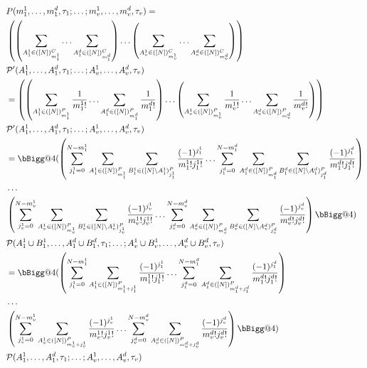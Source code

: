 \documentclass[12pt]{article}
\makeatletter
\newcommand{\vast}{\bBigg@{4}}
\makeatother
\begin{document}
\begin{align}
&P(m_1^1,\ldots,m_1^d,\tau_1; \ldots ; m_v^1, \ldots, m_v^d, \tau_v) =\\
&\left(\left(\sum_{A_1^1 \in ([N])_{m_1^1}^C} \ldots \sum_{A_1^d \in ([N])_{m_1^d}^C}\right) \ldots \left(\sum_{A_v^1 \in ([N])_{m_v^1}^C} \ldots \sum_{A_v^d \in ([N])_{m_v^d}^C}\right)\right)\\
&\mathcal{P'}(A_1^1, \ldots, A_1^d, \tau_1 ; \ldots ; A_v^1, \ldots,A_v^d,\tau_v)\\
&=\left(\left(\sum_{A_1^1 \in ([N])_{m_1^1}^P} \frac{1}{m_1^1!} \ldots \sum_{A_1^d \in ([N])_{m_1^d}^P} \frac{1}{m_1^d!} \right) \ldots \left(\sum_{A_v^1 \in ([N])_{m_v^1}^P} \frac{1}{m_v^1!}  \ldots \sum_{A_v^d \in ([N])_{m_v^d}^P}\frac{1}{m_v^d!} \right)\right)\\
&\mathcal{P'}(A_1^1, \ldots, A_1^d, \tau_1 ; \ldots ; A_v^1, \ldots,A_v^d,\tau_v)\\
&= \vast( \left(\sum_{j_1^1 =0}^{N-m_1^1} \sum_{A_1^1 \in ([N])_{m_1^1}^P} \sum_{B_1^1 \in ([N]\setminus A_1^1)_{j_1^1}^P} \frac{(-1)^{j_1^1}}{m_1^1! j_1^1!}
\ldots 
\sum_{j_1^d =0}^{N-m_1^d}  \sum_{A_1^d \in ([N])_{m_1^d}^P} \sum_{B_1^d \in ([N]\setminus A_1^d)_{j_1^d}^P} \frac{(-1)^{j_1^d}}{m_1^d! j_1^d!}\right)\\
&\ldots\\
&\left(\sum_{j_v^1 =0}^{N-m_v^1}  \sum_{A_v^1 \in ([N])_{m_v^1}^P} \sum_{B_v^1 \in ([N]\setminus A_v^1)_{j_v^1}^P} \frac{(-1)^{j_v^1}}{m_v^1! j_v^1!}
\ldots 
\sum_{j_v^d =0}^{N-m_v^d}  \sum_{A_v^d \in ([N])_{m_v^d}^P} \sum_{B_v^d \in ([N]\setminus A_v^d)_{j_v^d}^P} \frac{(-1)^{j_v^d}}{m_v^d! j_v^d!} \right) \vast)\\
&\mathcal{P}(A_1^1 \cup B_1^1, \ldots, A_1^d \cup B_1^d, \tau_1 ; \ldots ; A_v^1 \cup B_v^1, \ldots,A_v^d \cup B_v^d,\tau_v)\\
&= \vast( \left(\sum_{j_1^1 =0}^{N-m_1^1} \sum_{A_1^1 \in ([N])_{m_1^1+j_1^1}^P} \frac{(-1)^{j_1^1}}{m_1^1! j_1^1!}
\ldots 
\sum_{j_1^d =0}^{N-m_1^d}  \sum_{A_1^d \in ([N])_{m_1^d+j_1^d}^P} \frac{(-1)^{j_1^d}}{m_1^d! j_1^d!}\right)\\
&\ldots\\
&\left(\sum_{j_v^1 =0}^{N-m_v^1}  \sum_{A_v^1 \in ([N])_{m_v^1+j_v^1}^P}  \frac{(-1)^{j_v^1}}{m_v^1! j_v^1!}
\ldots 
\sum_{j_v^d =0}^{N-m_v^d}  \sum_{A_v^d \in ([N])_{m_v^d+j_v^d}^P}  \frac{(-1)^{j_v^d}}{m_v^d! j_v^d!} \right) \vast)\\
&\mathcal{P}(A_1^1, \ldots, A_1^d, \tau_1 ; \ldots ; A_v^1, \ldots,A_v^d,\tau_v)\\
\end{align}
\end{document}

